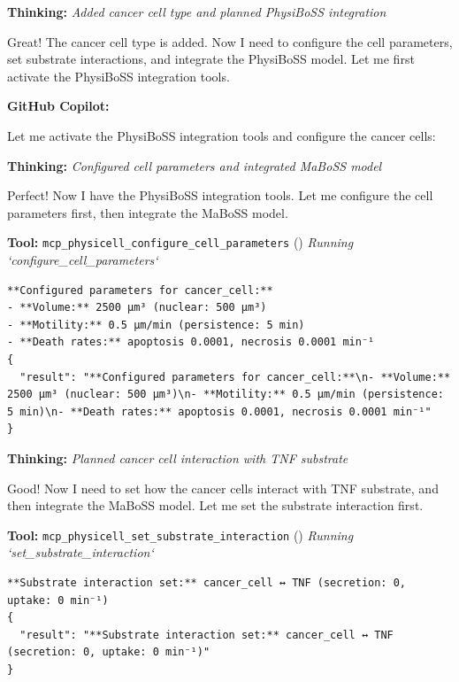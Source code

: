 \documentclass[11pt,a4paper]{article}
\begin{document}
\begin{thinkbox}
\textbf{Thinking:} \textit{Added cancer cell type and planned PhysiBoSS integration}

Great! The cancer cell type is added. Now I need to configure the cell parameters, set substrate interactions, and integrate the PhysiBoSS model. Let me first activate the PhysiBoSS integration tools.

\end{thinkbox}
\begin{copilotbox}
\textbf{GitHub Copilot:}

Let me activate the PhysiBoSS integration tools and configure the cancer cells:

\end{copilotbox}
\begin{thinkbox}
\textbf{Thinking:} \textit{Configured cell parameters and integrated MaBoSS model}

Perfect! Now I have the PhysiBoSS integration tools. Let me configure the cell parameters first, then integrate the MaBoSS model.

\end{thinkbox}
\begin{toolokbox}
\textbf{Tool:} \texttt{mcp\_physicell\_configure\_cell\_parameters} (\checkmark)
\textit{Running `configure\_cell\_parameters`}
\begin{lstlisting}
**Configured parameters for cancer_cell:**
- **Volume:** 2500 μm³ (nuclear: 500 μm³)
- **Motility:** 0.5 μm/min (persistence: 5 min)
- **Death rates:** apoptosis 0.0001, necrosis 0.0001 min⁻¹
{
  "result": "**Configured parameters for cancer_cell:**\n- **Volume:** 2500 μm³ (nuclear: 500 μm³)\n- **Motility:** 0.5 μm/min (persistence: 5 min)\n- **Death rates:** apoptosis 0.0001, necrosis 0.0001 min⁻¹"
}
\end{lstlisting}
\end{toolokbox}
\begin{thinkbox}
\textbf{Thinking:} \textit{Planned cancer cell interaction with TNF substrate}

Good! Now I need to set how the cancer cells interact with TNF substrate, and then integrate the MaBoSS model. Let me set the substrate interaction first.

\end{thinkbox}
\begin{toolokbox}
\textbf{Tool:} \texttt{mcp\_physicell\_set\_substrate\_interaction} (\checkmark)
\textit{Running `set\_substrate\_interaction`}
\begin{lstlisting}
**Substrate interaction set:** cancer_cell ↔ TNF (secretion: 0, uptake: 0 min⁻¹)
{
  "result": "**Substrate interaction set:** cancer_cell ↔ TNF (secretion: 0, uptake: 0 min⁻¹)"
}
\end{lstlisting}
\end{toolokbox}
\end{document}

